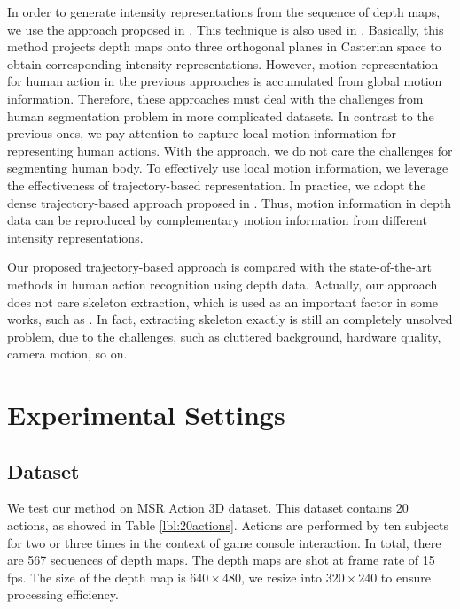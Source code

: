 \documentclass[review]{elsarticle}
\begin{document}
In order to generate intensity representations from the sequence of depth maps, we use the approach proposed in \cite{li2010action}. This technique is also used in \cite{yang2012recognizing}. Basically, this method projects depth maps onto three orthogonal planes in Casterian space to obtain corresponding intensity representations. However, motion representation for human action in the previous approaches is accumulated from global motion information. Therefore, these approaches must deal with the challenges from human segmentation problem in more complicated datasets. In contrast to the previous ones, we pay attention to capture local motion information for representing human actions. With the approach, we do not care the challenges for segmenting human body. To effectively use local motion information, we leverage the effectiveness of trajectory-based representation. In practice, we adopt the dense trajectory-based approach proposed in \cite{wang2011densetraj}. Thus, motion information in depth data can be reproduced by complementary motion information from different intensity representations.

Our proposed trajectory-based approach is compared with the state-of-the-art methods in human action recognition using depth data. Actually, our approach does not care skeleton extraction, which is used as an important factor in some works, such as \cite{wang2012mining, yang2012eigenjoints}. In fact, extracting skeleton exactly is still an completely unsolved problem, due to the challenges, such as cluttered background, hardware quality, camera motion, so on.

\section{Experimental Settings}
\label{lbl:ExperimentalSettings}

\subsection{Dataset}
We test our method on MSR Action 3D dataset. This dataset contains 20 actions, as showed in Table \ref{lbl:20actions}. Actions are performed by ten subjects for two or three times in the context of game console interaction. In total, there are 567 sequences of depth maps. The depth maps are shot at frame rate of 15 fps. The size of the depth map is $640 \times 480$, we resize into $320 \times 240$ to ensure processing efficiency.
\end{document}
